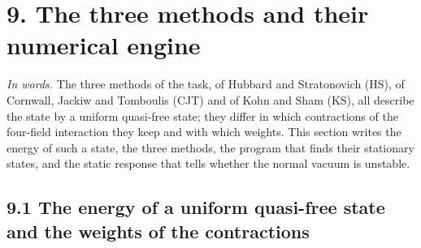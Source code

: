 \documentclass[
  10pt,
]{article}
\begin{document}
\hypertarget{the-three-methods-and-their-numerical-engine}{%
\section{9. The three methods and their numerical
engine}\label{the-three-methods-and-their-numerical-engine}}

\emph{In words.} The three methods of the task, of Hubbard and
Stratonovich (HS), of Cornwall, Jackiw and Tomboulis (CJT) and of Kohn
and Sham (KS), all describe the state by a uniform quasi-free state;
they differ in which contractions of the four-field interaction they
keep and with which weights. This section writes the energy of such a
state, the three methods, the program that finds their stationary
states, and the static response that tells whether the normal vacuum is
unstable.

\hypertarget{the-energy-of-a-uniform-quasi-free-state-and-the-weights-of-the-contractions}{%
\subsection{9.1 The energy of a uniform quasi-free state and the weights
of the
contractions}\label{the-energy-of-a-uniform-quasi-free-state-and-the-weights-of-the-contractions}}
\end{document}
